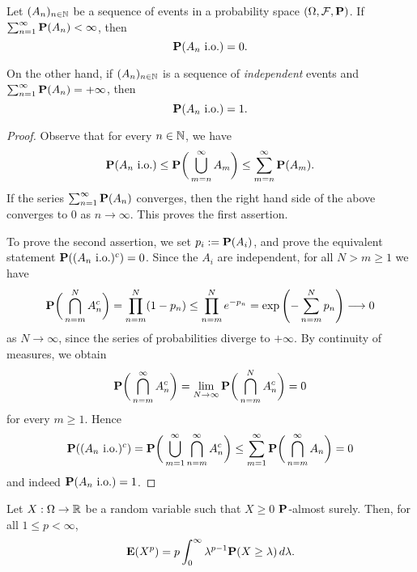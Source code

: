 \begin{lemma}
\label{lem:BC}
Let $(A_n)_{n\in\mathbb{N}}$ be a sequence of events in a probability space $(\Omega,\mathcal{F},\mathbf{P})$. If $\sum_{n=1}^\infty \mathbf{P}(A_n)<\infty$, then
\begin{equation*}
    \mathbf{P}(A_n \textnormal{ i.o.}) = 0.
\end{equation*}

On the other hand, if $(A_n)_{n\in\mathbb{N}}$ is a sequence of \emph{independent} events and $\sum_{n=1}^\infty \mathbf{P}(A_n) = +\infty$, then
\begin{equation*}
    \mathbf{P}(A_n \textnormal{ i.o.}) = 1.
\end{equation*}
\end{lemma}

\begin{proof}
    Observe that for every $n\in\mathbb{N}$, we have
    \begin{equation*}
        \mathbf{P}(A_n \text{ i.o.}) \le \mathbf{P}\bigg(\bigcup_{m=n}^\infty A_m\bigg) \le \sum_{m=n}^\infty \mathbf{P}(A_m).
    \end{equation*}
    If the series $\sum_{n=1}^\infty \mathbf{P}(A_n)$ converges, then the right hand side of the above converges to $0$ as $n\to\infty$. This proves the first assertion.

    To prove the second assertion, we set $p_i := \mathbf{P}(A_i)$, and prove the equivalent statement $\mathbf{P}((A_n \text{ i.o.})^c) = 0$. Since the $A_i$ are independent, for all $N>m\ge 1$ we have
    \begin{equation*}
    \mathbf{P}\bigg( \bigcap_{n=m}^N A_n^c \bigg) = \prod_{n=m}^N (1 - p_n) \le \prod_{n=m}^N e^{-p_n} = \exp\left( -\sum_{n=m}^N p_n \right) \longrightarrow 0
    \end{equation*}
    as $N\to\infty$, since the series of probabilities diverge to $+\infty$. By continuity of measures, we obtain
    \begin{equation*}
    \mathbf{P}\bigg(\bigcap_{n=m}^\infty A_n^c\bigg) = \lim_{N \to \infty} \mathbf{P}\bigg( \bigcap_{n=m}^N A_n^c \bigg) = 0
    \end{equation*}
    for every $m\ge 1$. Hence
    \begin{equation*}
    \mathbf{P}( (A_n \text{ i.o.})^c) = \mathbf{P}\bigg( \bigcup_{m=1}^\infty \bigcap_{n=m}^\infty A_n^c \bigg) \le \sum_{m=1}^\infty \mathbf{P}\bigg(\bigcap_{n=m}^\infty A_n\bigg) = 0
    \end{equation*}
    and indeed $\mathbf{P}(A_n \text{ i.o.}) = 1$.
\end{proof}

\begin{proposition}
	\label{prop:layer-cake}
	Let $X:\Omega\to\mathbb{R}$ be a random variable such that $X\ge 0$ $\mathbf{P}$-almost surely. Then, for all $1\le p<\infty$,
	\begin{equation}
		\mathbf{E}(X^p) = p\int_0^\infty \lambda^{p-1}\mathbf{P}(X\ge \lambda)\,d\lambda.
	\end{equation}
\end{proposition}

